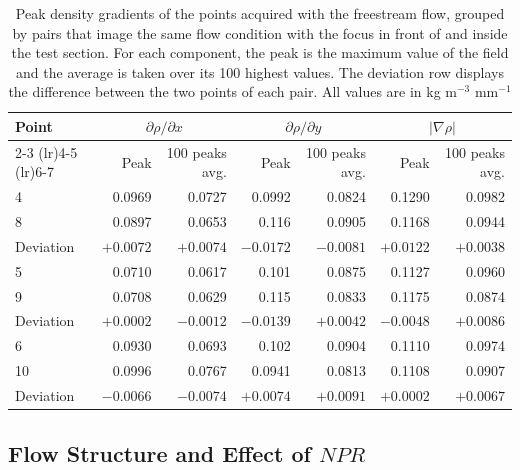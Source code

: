 \begin{table}[htbp]
    \centering
    \caption[Peak density gradients of the same flow imaged defocused and in focus]{Peak density gradients of the points acquired with the freestream flow, grouped by pairs that image the same flow condition with the focus in front of and inside the test section. For each component, the peak is the maximum value of the field and the average is taken over its 100 highest values. The deviation row displays the difference between the two points of each pair. All values are in kg m$^{-3}$ mm$^{-1}$}
    \label{tab: aerospike gradient peaks freestream}
    \begin{tabular}{lrrrrrr}
        \toprule
        Point & \multicolumn{2}{c}{$\partial \rho / \partial x$} & \multicolumn{2}{c}{$\partial \rho / \partial y$} & \multicolumn{2}{c}{$|\nabla \rho|$} \\
        \cmidrule(lr){2-3} \cmidrule(lr){4-5} \cmidrule(lr){6-7}
              & Peak & 100 peaks avg. & Peak & 100 peaks avg. & Peak & 100 peaks avg. \\
        \midrule
         4 & 0.0969 & 0.0727 & 0.0992 & 0.0824 & 0.1290 & 0.0982 \\
         8 & 0.0897 & 0.0653 & 0.116 & 0.0905 & 0.1168 & 0.0944 \\
        Deviation & $+0.0072$ & $+0.0074$ & $-0.0172$ & $-0.0081$ & $+0.0122$ & $+0.0038$ \\
        \midrule
         5 & 0.0710 & 0.0617 & 0.101 & 0.0875 & 0.1127 & 0.0960 \\
         9 & 0.0708 & 0.0629 & 0.115 & 0.0833 & 0.1175 & 0.0874 \\
        Deviation & $+0.0002$ & $-0.0012$ & $-0.0139$ & $+0.0042$ & $-0.0048$ & $+0.0086$ \\
        \midrule
         6 & 0.0930 & 0.0693 & 0.102 & 0.0904 & 0.1110 & 0.0974 \\
        10 & 0.0996 & 0.0767 & 0.0941 & 0.0813 & 0.1108 & 0.0907 \\
        Deviation & $-0.0066$ & $-0.0074$ & $+0.0074$ & $+0.0091$ & $+0.0002$ & $+0.0067$ \\
        \bottomrule
    \end{tabular}
\end{table}

\subsection{Flow Structure and Effect of \texorpdfstring{$NPR$}{NPR}}
\label{subsection: Aerospike Flow Structure}

